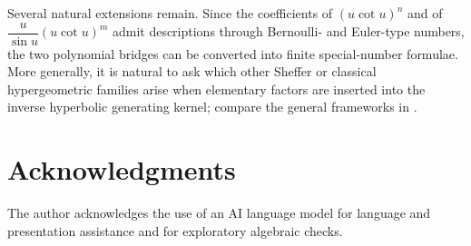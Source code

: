 \documentclass[11pt,twoside]{article}
\begin{document}
Several natural extensions remain.  Since the coefficients of
$(u\cot u)^n$ and of $\dfrac{u}{\sin u}(u\cot u)^m$ admit descriptions
through Bernoulli- and Euler-type numbers, the two polynomial bridges
can be converted into finite special-number formulae.  More generally,
it is natural to ask which other Sheffer or classical hypergeometric
families arise when elementary factors are inserted into the inverse
hyperbolic generating kernel; compare the general frameworks in
\cite{Sheffer1939,RotaKahanerOdlyzko1973,Roman1984,Meixner1934,
Ismail2009,NIST:DLMF,KoekoekLeskySwarttouw2010}.

\section*{Acknowledgments}
The author acknowledges the use of an AI language model for language and
presentation assistance and for exploratory algebraic checks.  

\printbibliography
\end{document}
